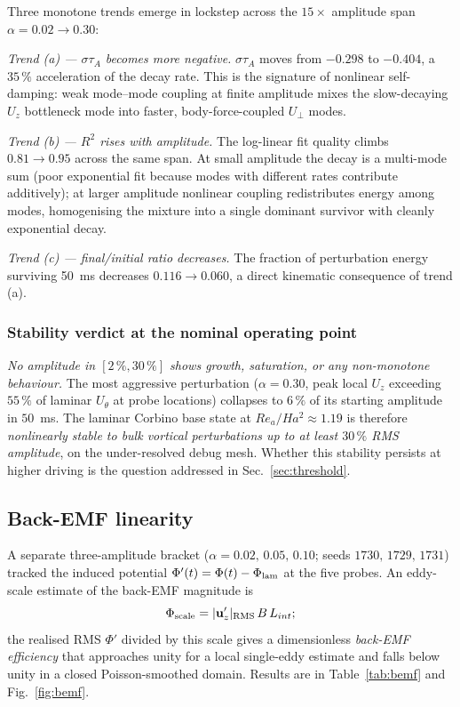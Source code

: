 \documentclass[aps,prl,twocolumn,superscriptaddress]{revtex4-2}
\begin{document}
Three monotone trends emerge in lockstep across the
$15\!\times\!$ amplitude span $\alpha\!=\!0.02\!\to\!0.30$:

\textit{Trend (a) --- $\sigma\tau_A$ becomes more negative.}
$\sigma\tau_A$ moves from $-0.298$ to $-0.404$, a $35\,\%$
acceleration of the decay rate.  This is the signature of nonlinear
self-damping: weak mode--mode coupling at finite amplitude mixes the
slow-decaying $U_z$ bottleneck mode into faster, body-force-coupled
$U_\perp$ modes.

\textit{Trend (b) --- $R^{2}$ rises with amplitude.}  The log-linear
fit quality climbs $0.81\!\to\!0.95$ across the same span.  At small
amplitude the decay is a multi-mode sum (poor exponential fit because
modes with different rates contribute additively); at larger amplitude
nonlinear coupling redistributes energy among modes, homogenising the
mixture into a single dominant survivor with cleanly exponential
decay.

\textit{Trend (c) --- final/initial ratio decreases.}  The fraction
of perturbation energy surviving 50~ms decreases
$0.116\!\to\!0.060$, a direct kinematic consequence of trend (a).

\subsubsection*{Stability verdict at the nominal operating point}
\textit{No amplitude in $[2\,\%, 30\,\%]$ shows growth, saturation,
or any non-monotone behaviour.}  The most aggressive perturbation
($\alpha = 0.30$, peak local $U_z$ exceeding $55\,\%$ of laminar
$U_\theta$ at probe locations) collapses to $6\,\%$ of its starting
amplitude in $50$~ms.  The laminar Corbino base state at
$Re_a/Ha^{2}\!\approx\!1.19$ is therefore \textit{nonlinearly stable
to bulk vortical perturbations up to at least $30\,\%$ RMS amplitude},
on the under-resolved debug mesh.  Whether this stability persists
at higher driving is the question addressed in
Sec.~\ref{sec:threshold}.

\subsection{Back-EMF linearity}
\label{sec:backemf}

A separate three-amplitude bracket
($\alpha = 0.02,\,0.05,\,0.10$; seeds $1730,\,1729,\,1731$) tracked
the induced potential $\Phi'(t) = \Phi(t) - \Phi_{\rm lam}$ at the
five probes.  An eddy-scale estimate of the back-EMF magnitude is
\begin{equation}
\Phi_{\rm scale} = |\mathbf{u}'_z|_{\rm RMS}\,B\,L_{int};
\label{eq:phi_scale}
\end{equation}
the realised RMS $\Phi'$ divided by this scale gives a dimensionless
\emph{back-EMF efficiency} that approaches unity for a local
single-eddy estimate and falls below unity in a closed
Poisson-smoothed domain.  Results are in Table~\ref{tab:bemf} and
Fig.~\ref{fig:bemf}.
\end{document}
